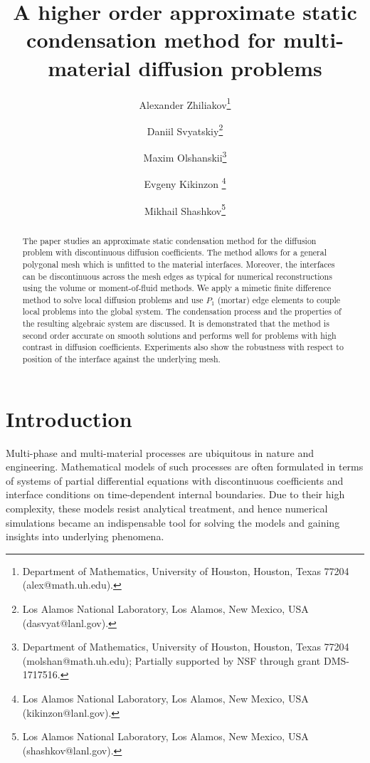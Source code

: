 \documentclass[12pt]{article}
\title{A higher order approximate static condensation method for multi-material diffusion problems}
\author{
	Alexander Zhiliakov\thanks{Department of Mathematics, University of Houston, Houston, Texas 77204 (alex@math.uh.edu).}
	\and Daniil Svyatskiy\thanks{Los Alamos National Laboratory, Los Alamos,
		New Mexico, USA (dasvyat@lanl.gov).}
	\and
	Maxim Olshanskii\thanks{Department of Mathematics, University of Houston, Houston, Texas 77204 (molshan@math.uh.edu); Partially supported by NSF through grant  DMS-1717516.}
	\and Evgeny Kikinzon \thanks{Los Alamos National Laboratory, Los Alamos,
		New Mexico, USA (kikinzon@lanl.gov).}
	\and Mikhail Shashkov\thanks{Los Alamos National Laboratory, Los Alamos,
		New Mexico, USA (shashkov@lanl.gov).}
}
\newcommand{\Sasha}[1]{\colorbox{Cyan}{\textbf{Sasha}:} #1}
\begin{document}
	
	\maketitle
	
	\let\oldtabular\tabular
	\renewcommand{\tabular}[1][1.5]{\def\arraystretch{#1}\oldtabular}
	
	
	\begin{abstract}
		The paper studies an approximate static condensation method for the diffusion problem with discontinuous diffusion coefficients. The method allows for a general polygonal mesh which is unfitted to the material interfaces. Moreover, the interfaces can be discontinuous across the mesh edges as typical for numerical reconstructions using the volume or moment-of-fluid methods.  We apply a mimetic finite difference method to solve local diffusion problems and use $P_1$ (mortar) edge elements to couple local problems into the global system. The condensation process and the properties of the resulting algebraic system are discussed. It is demonstrated that the method is second order accurate on smooth solutions and performs well for problems with high contrast in diffusion coefficients. Experiments also show the robustness with respect to position of the interface against the underlying mesh.
	\end{abstract}
	
	
	\section{Introduction}
	
	Multi-phase and multi-material processes are ubiquitous in nature and engineering.
	Mathematical models of such processes are often formulated in terms of systems of partial differential equations with discontinuous coefficients and interface conditions on time-dependent internal boundaries.
	Due to their high complexity, these models   resist analytical treatment, and hence numerical simulations became an indispensable tool for solving the models and gaining insights into underlying phenomena.
	
\end{document}
